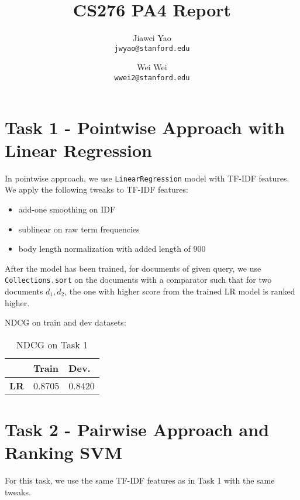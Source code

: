 \documentclass{article}
\begin{document}
\title{CS276 PA4 Report}

\author{
  Jiawei Yao\\
  \texttt{jwyao@stanford.edu}
  \and
  Wei Wei\\
  \texttt{wwei2@stanford.edu}
}

\maketitle

\section{Task 1 - Pointwise Approach with Linear Regression}

In pointwise approach, we use \texttt{LinearRegression} model with TF-IDF features.
We apply the following tweaks to TF-IDF features:

\begin{itemize}
    \item add-one smoothing on IDF
    \item sublinear on raw term frequencies
    \item body length normalization with added length of 900
\end{itemize}

After the model has been trained, for documents of given query, we use \texttt{Collections.sort} on the documents with a comparator such that
for two documents $d_1,d_2$, the one with higher score from the trained LR model is ranked higher.

NDCG on train and dev datasets:

\begin{table}[!htb]
    \centering
    \begin{tabular}{| r | l | l |}
        \hline
        & \textbf{Train} & \textbf {Dev.} \\
        \hline
        \textbf{LR} & 0.8705 & 0.8420 \\
        \hline
    \end{tabular}
    \caption{NDCG on Task 1}
\end{table}

\section{Task 2 - Pairwise Approach and Ranking SVM}

For this task, we use the same TF-IDF features as in Task 1 with the same tweaks.
\end{document}
